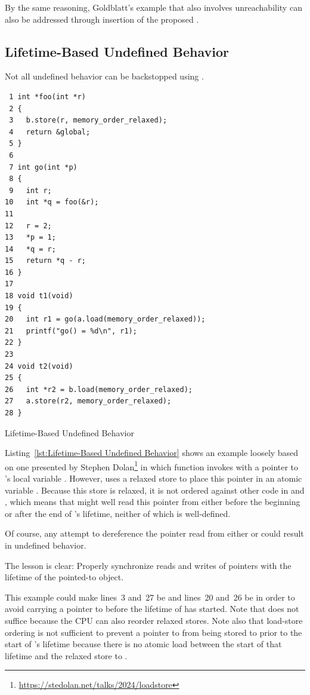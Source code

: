 \documentclass[10]{article}
\begin{document}
By the same reasoning, Goldblatt's  example that
also involves unreachability can also be addressed through insertion
of the proposed .

\subsection{Lifetime-Based Undefined Behavior}
\label{sec:Lifetime-Based Undefined Behavior}

Not all undefined behavior can be backstopped using
.

\begin{listing}[tbp]
\begin{verbatim}
 1 int *foo(int *r)
 2 {
 3   b.store(r, memory_order_relaxed);
 4   return &global;
 5 }
 6
 7 int go(int *p)
 8 {
 9   int r;
10   int *q = foo(&r);
11
12   r = 2;
13   *p = 1;
14   *q = r;
15   return *q - r;
16 }
17
18 void t1(void)
19 {
20   int r1 = go(a.load(memory_order_relaxed));
21   printf("go() = %d\n", r1);
22 }
23
24 void t2(void)
25 {
26   int *r2 = b.load(memory_order_relaxed);
27   a.store(r2, memory_order_relaxed);
28 }
\end{verbatim}
\caption{Lifetime-Based Undefined Behavior}
\label{lst:Lifetime-Based Undefined Behavior}
\end{listing}

Listing~\ref{lst:Lifetime-Based Undefined Behavior}
shows an example loosely based on one presented by Stephen Dolan\footnote{
	\url{https://stedolan.net/talks/2024/loadstore}}
in which function  invokes  with a pointer to 's
local variable .
However,  uses a relaxed store to place this pointer in
an atomic variable .
Because this store is relaxed, it is not ordered against other code
in  and , which means that  might well
read this pointer from  either before the beginning or after
the end of 's lifetime, neither of which is well-defined.

Of course, any attempt to dereference the pointer read from either
 or  could result in undefined behavior.

The lesson is clear:
Properly synchronize reads and writes of pointers with the lifetime
of the pointed-to object.

This example could make lines~3 and~27 be  and
lines~20 and~26 be  in order to avoid carrying
a pointer to  before the lifetime of  has started.
Note that  does not suffice because the CPU
can also reorder relaxed stores.
Note also that load-store ordering is not sufficient to prevent a
pointer to  from being stored to  prior to the start of
's lifetime because there is no atomic load between the start
of that lifetime and the relaxed store to .
\end{document}
